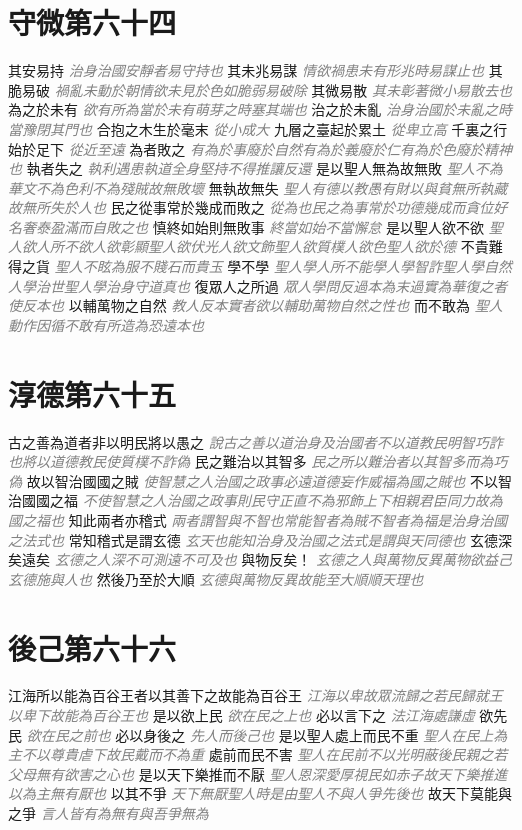 \documentclass[a4paper,zihao=-4,oneside,landscape,UTF8]{ctexart}
\newcommand{\zhushi}[1]{\scriptsize{\textit{\textcolor{gray}{#1}}}\normalsize}
\begin{document}
\section{守微第六十四}

其安易持
\zhushi{治身治國安靜者易守持也}
其未兆易謀
\zhushi{情欲禍患未有形兆時易謀止也}
其脆易破
\zhushi{禍亂未動於朝情欲未見於色如脆弱易破除}
其微易散
\zhushi{其未彰著微小易散去也}
為之於未有
\zhushi{欲有所為當於未有萌芽之時塞其端也}
治之於未亂
\zhushi{治身治國於未亂之時當豫閉其門也}
合抱之木生於毫末
\zhushi{從小成大}
九層之臺起於累土
\zhushi{從卑立高}
千裏之行始於足下
\zhushi{從近至遠}
為者敗之
\zhushi{有為於事廢於自然有為於義廢於仁有為於色廢於精神也}
執者失之
\zhushi{執利遇患執道全身堅持不得推讓反還}
是以聖人無為故無敗
\zhushi{聖人不為華文不為色利不為殘賊故無敗壞}
無執故無失
\zhushi{聖人有德以教愚有財以與貧無所執藏故無所失於人也}
民之從事常於幾成而敗之
\zhushi{從為也民之為事常於功德幾成而貪位好名奢泰盈滿而自敗之也}
慎終如始則無敗事
\zhushi{終當如始不當懈怠}
是以聖人欲不欲
\zhushi{聖人欲人所不欲人欲彰顯聖人欲伏光人欲文飾聖人欲質樸人欲色聖人欲於德}
不貴難得之貨
\zhushi{聖人不眩為服不賤石而貴玉}
學不學
\zhushi{聖人學人所不能學人學智詐聖人學自然人學治世聖人學治身守道真也}
復眾人之所過
\zhushi{眾人學問反過本為末過實為華復之者使反本也}
以輔萬物之自然
\zhushi{教人反本實者欲以輔助萬物自然之性也}
而不敢為
\zhushi{聖人動作因循不敢有所造為恐遠本也}


\section{淳德第六十五}

古之善為道者非以明民將以愚之
\zhushi{說古之善以道治身及治國者不以道教民明智巧詐也將以道德教民使質樸不詐偽}
民之難治以其智多
\zhushi{民之所以難治者以其智多而為巧偽}
故以智治國國之賊
\zhushi{使智慧之人治國之政事必遠道德妄作威福為國之賊也}
不以智治國國之福
\zhushi{不使智慧之人治國之政事則民守正直不為邪飾上下相親君臣同力故為國之福也}
知此兩者亦稽式
\zhushi{兩者謂智與不智也常能智者為賊不智者為福是治身治國之法式也}
常知稽式是謂玄德
\zhushi{玄天也能知治身及治國之法式是謂與天同德也}
玄德深矣遠矣
\zhushi{玄德之人深不可測遠不可及也}
與物反矣！
\zhushi{玄德之人與萬物反異萬物欲益己玄德施與人也}
然後乃至於大順
\zhushi{玄德與萬物反異故能至大順順天理也}


\section{後己第六十六}

江海所以能為百谷王者以其善下之故能為百谷王
\zhushi{江海以卑故眾流歸之若民歸就王以卑下故能為百谷王也}
是以欲上民
\zhushi{欲在民之上也}
必以言下之
\zhushi{法江海處謙虛}
欲先民
\zhushi{欲在民之前也}
必以身後之
\zhushi{先人而後己也}
是以聖人處上而民不重
\zhushi{聖人在民上為主不以尊貴虐下故民戴而不為重}
處前而民不害
\zhushi{聖人在民前不以光明蔽後民親之若父母無有欲害之心也}
是以天下樂推而不厭
\zhushi{聖人恩深愛厚視民如赤子故天下樂推進以為主無有厭也}
以其不爭
\zhushi{天下無厭聖人時是由聖人不與人爭先後也}
故天下莫能與之爭
\zhushi{言人皆有為無有與吾爭無為}
\end{document}
